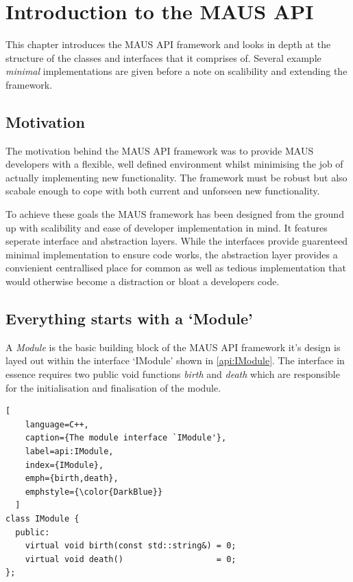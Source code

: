 


\chapter{Introduction to the MAUS API}
\label{chapter:api}
This chapter introduces the MAUS API framework and looks in depth at the structure of the classes and interfaces that it comprises of. Several example \emph{minimal} implementations are given before a note on scalibility and extending the framework. 

\section{Motivation}
The motivation behind the MAUS API framework was to provide MAUS developers with a flexible, well defined environment whilst minimising the job of actually implementing new functionality. The framework must be robust but also scabale enough to cope with both current and unforseen new functionality.

To achieve these goals the MAUS framework has been designed from the ground up with scalibility and ease of developer implementation in mind. It features seperate interface and abstraction layers. While the interfaces provide guarenteed minimal implementation to ensure code works, the abstraction layer provides a convienient centrallised place for common as well as tedious implementation that would otherwise become a distraction or bloat a developers code.

\section{Everything starts with a `Module'}
A \emph{Module} is the basic building block of the MAUS API framework it's design is layed out within the interface `IModule' shown in \ref{api:IModule}. The interface in essence requires two public void functions \emph{birth} and \emph{death} which are responsible for the initialisation and finalisation of the module.
\begin{lstlisting}[
    language=C++,
    caption={The module interface `IModule'},
    label=api:IModule, 
    index={IModule},
    emph={birth,death},
    emphstyle={\color{DarkBlue}}
  ]
class IModule {
  public:
    virtual void birth(const std::string&) = 0;
    virtual void death()                   = 0;
};
\end{lstlisting}

